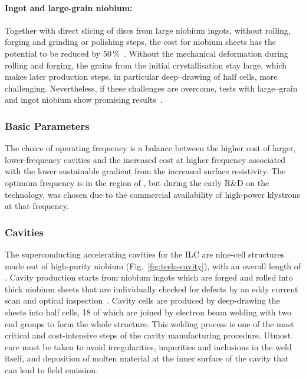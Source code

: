 \paragraph{Ingot and large-grain niobium:}

Together with direct slicing of discs from large niobium ingots, without rolling, forging and grinding or polishing steps, the cost for niobium sheets has the potential to be reduced by $50\,\%$~\cite{Evans:2017rvt,Kneisel:2014uqa}.
Without the mechanical deformation during rolling and forging, the grains from the initial crystallisation stay large, which makes later production steps, in particular deep--drawing of half cells, more challenging.
Nevertheless, if these challenges are overcome, tests with large--grain and ingot niobium show promising results~\cite{Reschke:2011a, Dhakal:2015xac}.


\subsubsection{Basic Parameters}

The choice of operating frequency is a balance between the higher cost of larger, lower-frequency cavities and the increased cost at higher frequency associated with the lower sustainable gradient from the increased surface resistivity. 
The optimum frequency is in the region of , but during the early R\&D on the technology,  was chosen due to the commercial availability of high-power klystrons at that frequency.

\subsubsection{Cavities}

The superconducting accelerating cavities for the ILC are nine-cell structures made out of high-purity niobium (Fig.~\ref{fig:tesla-cavity}), with an overall length of .
Cavity production starts from niobium ingots which are forged and rolled into  thick niobium sheets that are individually checked for defects by an eddy current scan and optical inspection~\cite{Adolphsen:2013jya}.
Cavity cells are produced by deep-drawing the sheets into half cells, \num{18} of which are joined by electron beam welding with two end groups to form the whole structure.
This welding process is one of the most critical and cost-intensive steps of the cavity manufacturing procedure. 
Utmost care must be taken to avoid irregularities, impurities and inclusions in the weld itself, and deposition of molten material at the inner surface of the cavity that can lead to field emission.

